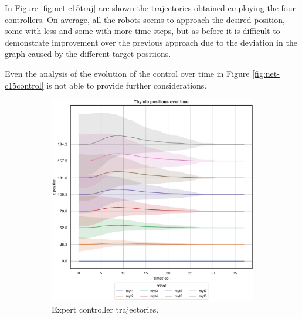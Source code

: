 In Figure \ref{fig:net-c15traj} are shown the trajectories obtained employing the 
four controllers.  On average, all the robots seems to approach the desired 
position, some with less and some with more time steps, but as before it is difficult 
to demonstrate improvement over the previous approach due to the deviation in 
the graph caused by the different target positions.

Even the analysis of the evolution of the control over time in Figure 
\ref{fig:net-c15control} is not able to provide further considerations.
\begin{figure}[!htb]
	\begin{center}
		\begin{subfigure}[h]{0.49\textwidth}
			\centering
			\includegraphics[width=.9\textwidth]{contents/images/net-d15/position-overtime-omniscient}%
			\caption{Expert controller trajectories.}
		\end{subfigure}
		\hfill
		\begin{subfigure}[h]{0.49\textwidth}
			\centering

\end{subfigure}
\end{center}
\end{figure}
